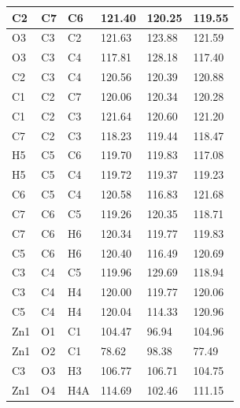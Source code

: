 \begin{longtable}{|l|l|l|lll|}
C2 & C7 & C6 & \multicolumn{1}{l|}{121.40} & \multicolumn{1}{l|}{120.25} & 119.55 \\ \hline
O3 & C3 & C2 & \multicolumn{1}{l|}{121.63} & \multicolumn{1}{l|}{123.88} & 121.59 \\ \hline
O3 & C3 & C4 & \multicolumn{1}{l|}{117.81} & \multicolumn{1}{l|}{128.18} & 117.40 \\ \hline
C2 & C3 & C4 & \multicolumn{1}{l|}{120.56} & \multicolumn{1}{l|}{120.39} & 120.88 \\ \hline
C1 & C2 & C7 & \multicolumn{1}{l|}{120.06} & \multicolumn{1}{l|}{120.34} & 120.28 \\ \hline
C1 & C2 & C3 & \multicolumn{1}{l|}{121.64} & \multicolumn{1}{l|}{120.60} & 121.20 \\ \hline
C7 & C2 & C3 & \multicolumn{1}{l|}{118.23} & \multicolumn{1}{l|}{119.44} & 118.47 \\ \hline
H5 & C5 & C6 & \multicolumn{1}{l|}{119.70} & \multicolumn{1}{l|}{119.83} & 117.08 \\ \hline
H5 & C5 & C4 & \multicolumn{1}{l|}{119.72} & \multicolumn{1}{l|}{119.37} & 119.23 \\ \hline
C6 & C5 & C4 & \multicolumn{1}{l|}{120.58} & \multicolumn{1}{l|}{116.83} & 121.68 \\ \hline
C7 & C6 & C5 & \multicolumn{1}{l|}{119.26} & \multicolumn{1}{l|}{120.35} & 118.71 \\ \hline
C7 & C6 & H6 & \multicolumn{1}{l|}{120.34} & \multicolumn{1}{l|}{119.77} & 119.83 \\ \hline
C5 & C6 & H6 & \multicolumn{1}{l|}{120.40} & \multicolumn{1}{l|}{116.49} & 120.69 \\ \hline
C3 & C4 & C5 & \multicolumn{1}{l|}{119.96} & \multicolumn{1}{l|}{129.69} & 118.94 \\ \hline
C3 & C4 & H4 & \multicolumn{1}{l|}{120.00} & \multicolumn{1}{l|}{119.77} & 120.06 \\ \hline
C5 & C4 & H4 & \multicolumn{1}{l|}{120.04} & \multicolumn{1}{l|}{114.33} & 120.96 \\ \hline
Zn1 & O1 & C1 & \multicolumn{1}{l|}{104.47} & \multicolumn{1}{l|}{96.94} & 104.96 \\ \hline
Zn1 & O2 & C1 & \multicolumn{1}{l|}{78.62} & \multicolumn{1}{l|}{98.38} & 77.49 \\ \hline
C3 & O3 & H3 & \multicolumn{1}{l|}{106.77} & \multicolumn{1}{l|}{106.71} & 104.75 \\ \hline
Zn1 & O4 & H4A & \multicolumn{1}{l|}{114.69} & \multicolumn{1}{l|}{102.46} & 111.15 \\ \hline

\end{longtable}
